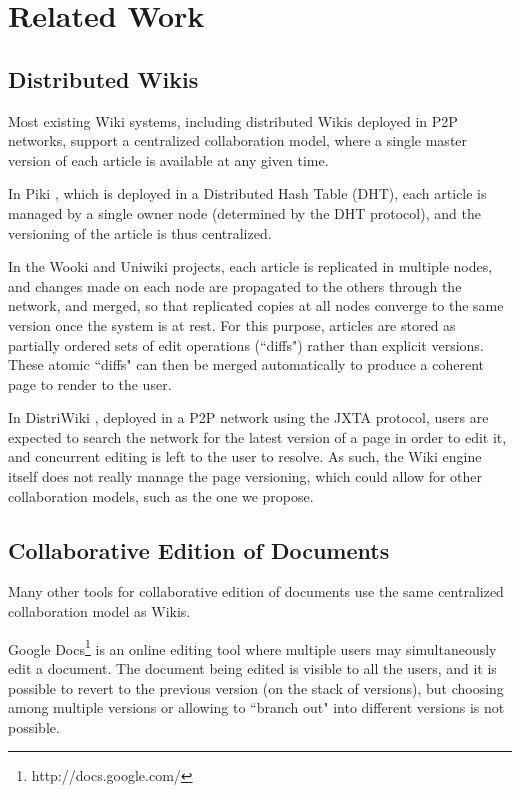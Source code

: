 \section{Related Work}

\subsection{Distributed Wikis} 

Most existing Wiki systems, including distributed Wikis deployed in P2P networks, support a centralized collaboration model, where a single master version of each article is available at any given time. 

In Piki \cite{Mukherkjee:piki}, which is deployed in a Distributed Hash Table (DHT), each article is managed by a single owner node (determined by the DHT protocol), and the versioning of the article is thus centralized. 

In the Wooki \cite{ Weiss:2007:WPW:1781374.1781430} and Uniwiki \cite{Oster:2009:UCP:1590968.1591823} projects, each article is replicated in multiple nodes, and changes made on each node are propagated to the others through the network, and merged, so that replicated copies at all nodes converge to the same version once the system is at rest. For this purpose, articles are stored as partially ordered sets of edit operations (``diffs") rather than explicit versions. These atomic ``diffs" can then be merged automatically to produce a coherent page to render to the user. 

In DistriWiki \cite{Morris2007}, deployed in a P2P network using the JXTA protocol, users are expected to search the network for the latest version of a page in order to edit it, and concurrent editing is left to the user to resolve. As such, the Wiki engine itself does not really manage the page versioning, which could allow for other collaboration models, such as the one we propose. 

\subsection{Collaborative Edition of Documents}

Many other tools for collaborative edition of documents use the same centralized collaboration model as Wikis. 

Google Docs\footnote{http://docs.google.com/} is an online editing tool where multiple users may simultaneously edit a document. The document being edited is visible to all the users, and it is possible to revert to the previous version (on the stack of versions), but choosing among multiple versions or allowing to ``branch out" into different versions is not possible.

